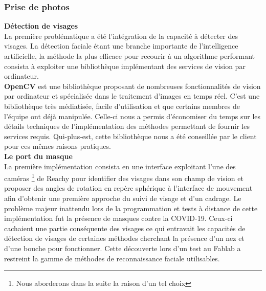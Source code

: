 \documentclass[a4paper,french]{article}
\begin{document}
\subsubsection{Prise de photos}
\textbf{Détection de visages}\\

La première problématique a été l'intégration de la capacité à détecter des visages. La détection faciale étant une branche importante de l'intelligence artificielle, la méthode la plus efficace pour recourir à un algorithme performant consista à exploiter une bibliothèque implémentant des services de vision par ordinateur.\\

\textbf{OpenCV} est une bibliothèque proposant de nombreuses fonctionnalités de vision par ordinateur et spécialisée dans le traitement d'images en temps réel. C'est une bibliothèque très médiatisée, facile d'utilisation et que certains membres de l'équipe ont déjà manipulée. Celle-ci nous a permis d'économiser du temps sur les détails techniques de l'implémentation des méthodes permettant de fournir les services requis. Qui-plus-est, cette bibliothèque nous a été conseillée par le client pour ces mêmes raisons pratiques.\\

\textbf{Le port du masque}\\

La première implémentation consista en une interface exploitant l'une des caméras \footnote{Nous aborderons dans la suite la raison d'un tel choix} de Reachy pour identifier des visages dans son champ de vision et proposer des angles de rotation en repère sphérique à l'interface de mouvement afin d'obtenir une première approche du suivi de visage et d'un cadrage. Le problème majeur inattendu lors de la programmation et tests à distance de cette implémentation fut la présence de masques contre la COVID-19. Ceux-ci cachaient une partie conséquente des visages ce qui entravait les capacités de détection de visages de certaines méthodes cherchant la présence d'un nez et d'une bouche pour fonctionner. Cette découverte lors d'un test au Fablab a restreint la gamme de méthodes de reconnaissance faciale utilisables.\\
\end{document}
